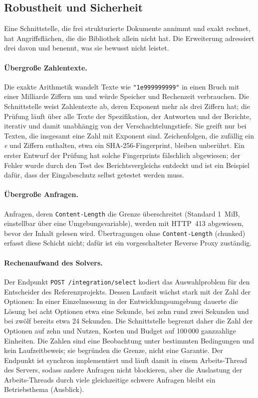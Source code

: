 \documentclass[a4paper,12pt]{article}
\theoremstyle{definition}
\begin{document}
\subsection{Robustheit und Sicherheit}
\label{sec:api-robust}
Eine Schnittstelle, die frei strukturierte Dokumente annimmt und exakt rechnet, hat Angriffsflächen, die die Bibliothek allein nicht hat. Die Erweiterung adressiert drei davon und benennt, was sie bewusst nicht leistet.

\paragraph{Übergroße Zahlentexte.}
Die exakte Arithmetik wandelt Texte wie \texttt{"1e999999999"} in einen Bruch mit einer Milliarde Ziffern um und würde Speicher und Rechenzeit verbrauchen. Die Schnittstelle weist Zahlentexte ab, deren Exponent mehr als drei Ziffern hat; die Prüfung läuft über alle Texte der Spezifikation, der Antworten und der Berichte, iterativ und damit unabhängig von der Verschachtelungstiefe. Sie greift nur bei Texten, die insgesamt eine Zahl mit Exponent sind. Zeichenfolgen, die zufällig ein \emph{e} und Ziffern enthalten, etwa ein SHA-256-Fingerprint, bleiben unberührt. Ein erster Entwurf der Prüfung hat solche Fingerprints fälschlich abgewiesen; der Fehler wurde durch den Test des Berichtsvergleichs entdeckt und ist ein Beispiel dafür, dass der Eingabeschutz selbst getestet werden muss.

\paragraph{Übergroße Anfragen.}
Anfragen, deren \texttt{Content-Length} die Grenze überschreitet (Standard 1~MiB, einstellbar über eine Umgebungsvariable), werden mit HTTP~413 abgewiesen, bevor der Inhalt gelesen wird. Übertragungen ohne \texttt{Content-Length} (chunked) erfasst diese Schicht nicht; dafür ist ein vorgeschalteter Reverse Proxy zuständig.

\paragraph{Rechenaufwand des Solvers.}
Der Endpunkt \texttt{POST /integration/select} kodiert das Auswahlproblem für den Entscheider des Referenzprojekts. Dessen Laufzeit wächst stark mit der Zahl der Optionen: In einer Einzelmessung in der Entwicklungsumgebung dauerte die Lösung bei acht Optionen etwa eine Sekunde, bei zehn rund zwei Sekunden und bei zwölf bereits etwa 24 Sekunden. Die Schnittstelle begrenzt daher die Zahl der Optionen auf zehn und Nutzen, Kosten und Budget auf 100\,000 ganzzahlige Einheiten. Die Zahlen sind eine Beobachtung unter bestimmten Bedingungen und kein Laufzeitbeweis; sie begründen die Grenze, nicht eine Garantie. Der Endpunkt ist synchron implementiert und läuft damit in einem Arbeits-Thread des Servers, sodass andere Anfragen nicht blockieren, aber die Auslastung der Arbeits-Threads durch viele gleichzeitige schwere Anfragen bleibt ein Betriebsthema (Ausblick).
\end{document}
